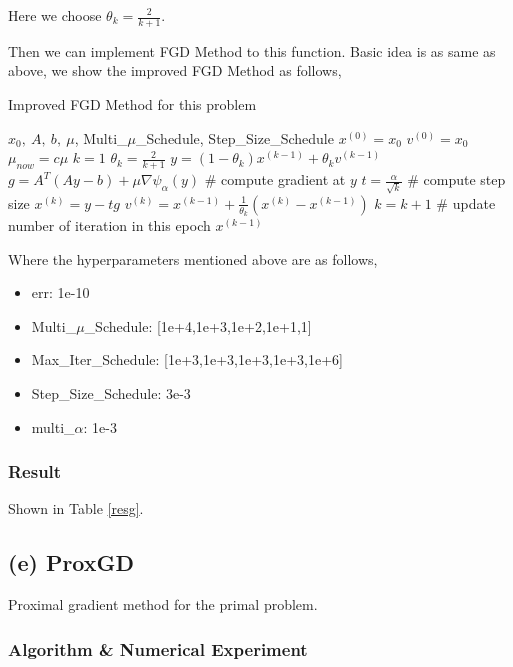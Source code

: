 \documentclass[]{article}
\begin{document}
Here we choose $\theta_k = \frac{2}{k+1}$.

Then we can implement FGD Method to this function. Basic idea is as same as above, we show the improved FGD Method as follows,


\begin{algorithm}[!h]
	\caption{Improved FGD Method for this problem}
	\label{igd}
	\begin{algorithmic}
		\REQUIRE $x_0, \ A,\  b,\  \mu $, Multi\_$\mu$\_Schedule, Step\_Size\_Schedule
		\STATE $x^{(0)}=x_0$
		\STATE $v^{(0)}=x_0$
		\STATE $\mu_{now} = c\mu$
		\STATE $k = 1$
		\STATE $\theta_k=\frac{2}{k+1}$
		\STATE $y=(1-\theta_k)x^{(k-1)} + \theta_k v^{(k-1)}$
		\STATE $g = A^T(Ay-b)+\mu \nabla \psi_{\alpha}(y)$ \# compute gradient at $y$
		\STATE $t = \frac{\alpha}{\sqrt{k}}$ \# compute step size
		\STATE $x^{(k)}=y-tg$
		\STATE $v^{(k)} = x^{(k-1)} + \frac{1}{\theta_k}(x^{(k)}-x^{(k-1)})$
		\STATE $k = k + 1$ \# update number of iteration in this epoch
		\ENDWHILE
		\ENDFOR
		\ENSURE $x^{(k-1)}$
	\end{algorithmic}
\end{algorithm}

Where the hyperparameters mentioned above are as follows,

\begin{itemize}
	\item err: 1e-10
	\item Multi\_$\mu$\_Schedule: [1e+4,1e+3,1e+2,1e+1,1]
	\item Max\_Iter\_Schedule: [1e+3,1e+3,1e+3,1e+3,1e+6]
	\item Step\_Size\_Schedule: 3e-3
	\item multi\_$\alpha$: 1e-3
\end{itemize}

\subsubsection{Result}
Shown in Table \ref{resg}.


\subsection{(e) ProxGD}
\noindent
Proximal gradient method for the primal problem.

\subsubsection{Algorithm \& Numerical Experiment}
\end{document}
